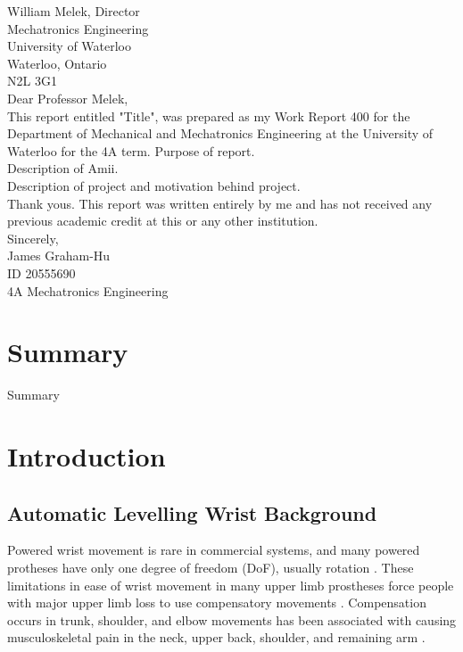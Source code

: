 \documentclass[letterpaper,12pt]{article}
\begin{document}
William Melek, Director\\
Mechatronics Engineering\\
University of Waterloo\\
Waterloo, Ontario\\
N2L 3G1\\

Dear Professor Melek,\\

This report entitled "Title", was prepared as my Work Report 400 for the Department of Mechanical and Mechatronics Engineering at the University of Waterloo for the 4A term. Purpose of report.\\

Description of Amii.\\

Description of project and motivation behind project.\\


Thank yous.
This report was written entirely by  me and has not received any previous academic credit at this or any other institution.\\

Sincerely,\\

James Graham-Hu\\
ID 20555690\\
4A Mechatronics Engineering



\pagebreak
\tableofcontents
\setcounter{page}{1}
\pagebreak
\listoffigures
\pagebreak
\listoftables
\pagebreak


\section{Summary}
Summary
\pagebreak
\section{Introduction}

\subsection{Automatic Levelling Wrist Background}
Powered wrist movement is rare in commercial systems, and many powered protheses have only one degree of freedom (DoF), usually rotation \cite{n.m.bajaj}. These limitations in ease of wrist movement in many upper limb prostheses force people with major upper limb loss to use compensatory movements \cite{s.l.carey}. Compensation occurs in trunk, shoulder, and elbow movements has been associated with causing musculoskeletal pain in the neck, upper back, shoulder, and remaining arm \cite{k.ostlie}.
\end{document}
